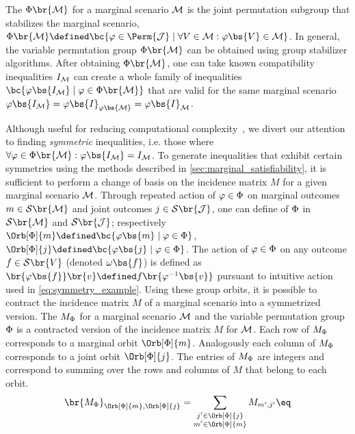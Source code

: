 \documentclass[aps, 10pt, english, twoside, pra, nofootinbib, tightenlines, longbibliography, superscriptaddress]{revtex4-1}
\renewcommand{\Events}[1]{\mathcal{S}\br{#1}} %
\begin{document}
    The  $\gp\br{\mscenario}$ for a marginal scenario $\mathcal{M}$ is the joint permutation subgroup that stabilizes the marginal scenario, $\Phi\br{\mscenario} \defined \bc{\varphi \in \Perm{\jointvar} \mid \forall V \in \mscenario : \varphi\bs{V} \in \mscenario}$.
    In general, the variable permutation group $\gp\br{\mscenario}$ can be obtained using group stabilizer algorithms. After obtaining $\gp\br{\mscenario}$, one can take known compatibility inequalities $I_{\mathcal{M}}$ can create a whole family of inequalities $\bc{\varphi\bs{I_{\mscenario}} \mid \varphi \in \gp\br{\mscenario}}$ that are valid for the same marginal scenario $\varphi\bs{I_{\mscenario}} = \varphi\bs{I}_{\varphi\bs{\mscenario}} = \varphi\bs{I}_{\mscenario}$.

    Although useful for reducing computational complexity~\cite{Bancal_2010}, we divert our attention to finding \textit{symmetric} inequalities, i.e. those where $\forall \varphi \in \gp\br{\mscenario} :  \varphi\bs{I_{\mscenario}} = I_{\mscenario}$. To generate inequalities that exhibit certain symmetries using the methods described in \cref{sec:marginal_satisfiability}, it is sufficient to perform a change of basis on the incidence matrix $M$ for a given marginal scenario $\mathcal{M}$. Through repeated action of $\varphi \in \Phi$ on marginal outcomes $m \in \Events{\mscenario}$ and joint outcomes $j \in \Events{\jointvar}$, one can define  of $\Phi$ in $\Events{\mscenario}$ and $\Events{\jointvar}$; respectively $\Orb[\gp]{m} \defined \bc{\varphi\bs{m} \mid \varphi \in \gp}$, $\Orb[\gp]{j} \defined \bc{\varphi\bs{j} \mid \varphi \in \gp}$. The action of $\varphi \in \Phi$ on any outcome $f \in \Events{V}$ (denoted $\geo\bs{f}$) is defined as $\br{\varphi\bs{f}}\br{v} \defined f\br{\varphi^{-1}\bs{v}}$ pursuant to intuitive action used in \cref{eq:symmetry_example}. Using these group orbits, it is possible to contract the incidence matrix $M$ of a marginal scenario into a symmetrized version. The  $M_{\Phi}$ for a marginal scenario $\mathcal{M}$ and the variable permutation group $\Phi$ is a contracted version of the incidence matrix $M$ for $\mathcal{M}$. Each row of $M_{\Phi}$ corresponds to a marginal orbit $\Orb[\gp]{m}$. Analogously each column of $M_{\Phi}$ corresponds to a joint orbit $\Orb[\gp]{j}$. The entries of $M_{\Phi}$ are integers and correspond to summing over the rows and columns of $M$ that belong to each orbit.
    \[ \br{M_{\gp}}_{\Orb[\gp]{m}, \Orb[\gp]{j}} = \sum_{\substack{j' \in \Orb[\gp]{j} \\ m' \in \Orb[\gp]{m}}} M_{m',j'} \eq \]
\end{document}
